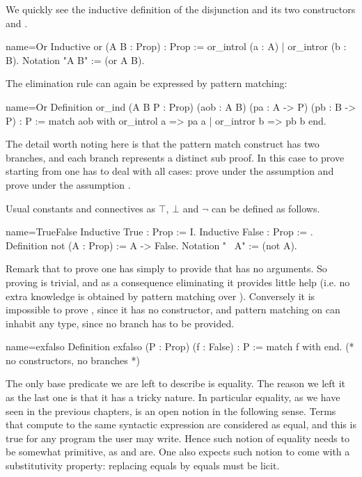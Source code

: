 We quickly see the inductive definition of the disjunction 
and its two constructors  and .

\begin{coq}{name=Or}{}
Inductive or (A B : Prop) : Prop := or_introl (a : A) | or_intror (b : B).
Notation "A \/ B" := (or A B).
\end{coq}

The elimination rule can again be expressed by pattern matching:

\begin{coq}{name=Or}{}
Definition or_ind (A B P : Prop)
  (aob : A \/ B) (pa : A -> P) (pb : B -> P) : P :=
  match aob with or_introl a => pa a | or_intror b => pb b end.
\end{coq}

The detail worth noting here is that the pattern match construct has two
branches, and each branch represents a distinct sub proof.  In this
case to prove  starting from  one has to deal with all
cases: prove  under the assumption  and prove 
under the assumption .

Usual constants and connectives as $\top$, $\bot$ and $\neg$
can be defined as follows.

\begin{coq}{name=TrueFalse}{}
Inductive True : Prop := I.
Inductive False : Prop := .
Definition not (A : Prop) := A -> False.
Notation "~ A" := (not A).
\end{coq}

Remark that to prove  one has simply to provide  that has no
arguments.  So proving  is trivial, and as a consequence eliminating it
provides little help (i.e. no extra knowledge is obtained by pattern matching
over ).  Conversely it is impossible to prove , since it has no
constructor, and pattern matching on  can inhabit any type, since no
branch has to be provided.

\begin{coq}{name=exfalso}{}
Definition exfalso (P : Prop) (f : False) : P :=
  match f with end.  (* no constructors, no branches *)
\end{coq}

The only base predicate we are left to describe is equality.  The reason we
left it as the last one is that it has a tricky nature.  In particular
equality, as we have seen in the previous chapters, is an open notion
in the following sense.  Terms that compute to the same syntactic expression
are considered as equal, and this is true for any program the user may write.
Hence such notion of equality needs to be somewhat primitive, as
 and  are.  One also expects such notion to come
with a substitutivity property: replacing equals by equals must be licit.

